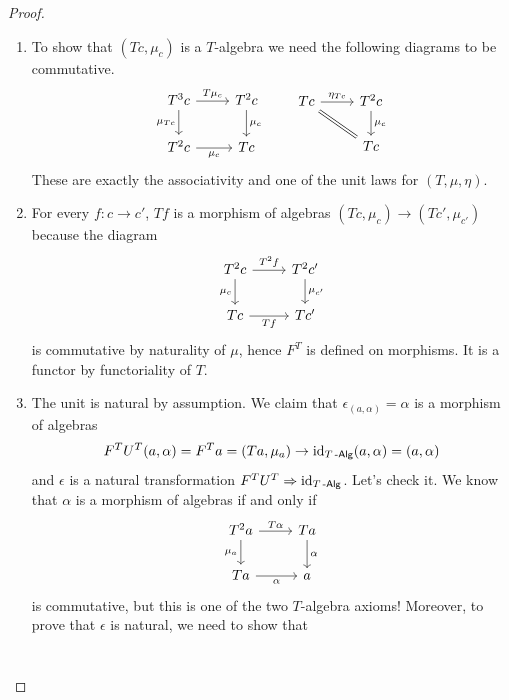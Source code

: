 \documentclass[a4paper,11pt,oneside,openany]{scrbook}
\begin{document}
\begin{proof}
	\begin{enumerate}[label=(\roman*)]
		\item To show that $(Tc, \mu_c)$ is a $T$-algebra we need the following diagrams to be commutative.
		      \[
			      \begin{tikzcd}
				      T^3c\ar["\mu_{Tc}"', rightarrow]{d}\ar["T\mu_c", rightarrow]{r}
				      & T^2c\ar["\mu_c", rightarrow]{d} \\
				      T^2c\ar["\mu_c"', rightarrow]{r}
				      & Tc
			      \end{tikzcd}
			      \quad\quad
			      \begin{tikzcd}
				      Tc\ar["\eta_{Tc}",rightarrow]{r}\ar[equal]{dr}
				      & T^2c\ar["\mu_c", rightarrow]{d}
				      \\
				      & Tc
			      \end{tikzcd}
		      \]
		      These are exactly the associativity and one of the unit laws for $(T, \mu, \eta)$.
		\item For every $f\colon c\to c'$, $Tf$ is a morphism of algebras $(Tc,\mu_c)\to(Tc', \mu_{c'})$ because the diagram
		      \[
			      \begin{tikzcd}
				      T^2c\ar["\mu_{c}"', rightarrow]{d}\ar["T^2f", rightarrow]{r}
				      & T^2c'\ar["\mu_{c'}", rightarrow]{d} \\
				      Tc\ar["Tf"', rightarrow]{r}
				      & Tc'
			      \end{tikzcd}
		      \]
		      is commutative by naturality of $\mu$, hence $F^T$ is defined on morphisms. It is a functor by functoriality of $T$.
		\item The unit is natural by assumption. We claim that $\epsilon_{(a,\alpha)}=\alpha$ is a morphism of algebras $$F^TU^T(a,\alpha)=F^Ta=(Ta,\mu_a) \to \operatorname{id}_{T\operatorname{-\mathsf{Alg}}}(a,\alpha)=(a,\alpha)$$ and $\epsilon$ is a natural transformation $F^TU^T\Rightarrow\operatorname{id}_{T\operatorname{-\mathsf{Alg}}}$. Let's check it. We know that $\alpha$ is a morphism of algebras if and only if
		      \[
			      \begin{tikzcd}
				      T^2 a\ar["\mu_{a}"']{d}\ar["T\alpha"]{r}
				      & Ta\ar["\alpha"]{d} \\
				      Ta\ar["\alpha"']{r}
				      & a
			      \end{tikzcd}
		      \]
		      is commutative, but this is one of the two $T$-algebra axioms! Moreover, to prove that $\epsilon$ is natural, we need to show that
		      \[
			      \begin{tikzcd}

\end{tikzcd}\]
\end{enumerate}
\end{proof}
\end{document}
